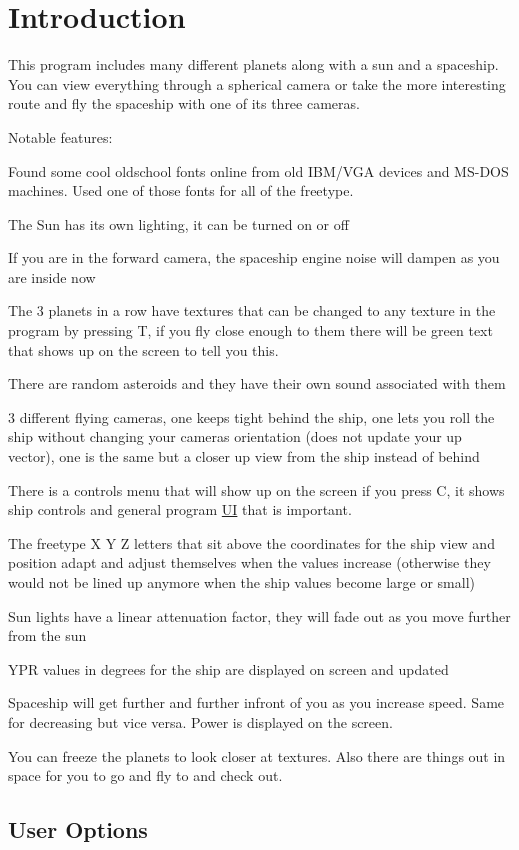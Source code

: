 \hypertarget{index_intro}{}\section{Introduction}\label{index_intro}
This program includes many different planets along with a sun and a spaceship. You can view everything through a spherical camera or take the more interesting route and fly the spaceship with one of it\textquotesingle{}s three cameras.

Notable features\+:
\begin{DoxyItemize}
\item Found some cool oldschool fonts online from old I\+B\+M/\+V\+GA devices and M\+S-\/\+D\+OS machines. Used one of those fonts for all of the freetype.
\item The Sun has it\textquotesingle{}s own lighting, it can be turned on or off
\item If you are in the forward camera, the spaceship engine noise will dampen as you are inside now
\item The 3 planets in a row have textures that can be changed to any texture in the program by pressing T, if you fly close enough to them there will be green text that shows up on the screen to tell you this.
\item There are random asteroids and they have their own sound associated with them
\item 3 different flying cameras, one keeps tight behind the ship, one lets you roll the ship without changing your camera\textquotesingle{}s orientation (does not update your up vector), one is the same but a closer up view from the ship instead of behind
\item There is a controls menu that will show up on the screen if you press C, it shows ship controls and general program \hyperlink{class_u_i}{UI} that is important.
\item The freetype X Y Z letters that sit above the coordinates for the ship view and position adapt and adjust themselves when the values increase (otherwise they would not be lined up anymore when the ship values become large or small)
\item Sun lights have a linear attenuation factor, they will fade out as you move further from the sun
\item Y\+PR values in degrees for the ship are displayed on screen and updated
\item Spaceship will get further and further infront of you as you increase speed. Same for decreasing but vice versa. Power is displayed on the screen.
\item You can freeze the planets to look closer at textures. Also there are things out in space for you to go and fly to and check out.
\end{DoxyItemize}\hypertarget{index_options}{}\subsection{User Options}\label{index_options}

